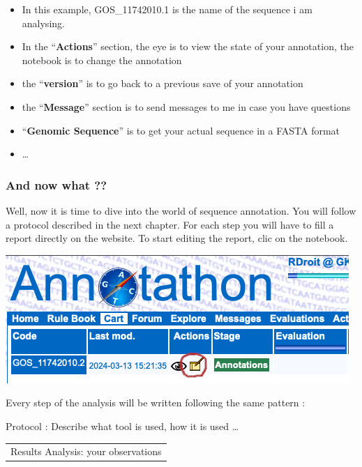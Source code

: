 \documentclass[
]{book}
\providecommand{\tightlist}{%
  \setlength{\itemsep}{0pt}\setlength{\parskip}{0pt}}
\begin{document}
\begin{itemize}
\tightlist
\item
  In this example, GOS\_11742010.1 is the name of the sequence i am analysing.
\item
  In the ``\textbf{Actions}'' section, the eye is to view the state of your annotation, the notebook is to change the annotation
\item
  the ``\textbf{version}'' is to go back to a previous save of your annotation
\item
  the ``\textbf{Message}'' section is to send messages to me in case you have questions
\item
  ``\textbf{Genomic Sequence}'' is to get your actual sequence in a FASTA format
\item
  \ldots{}
\end{itemize}

\hypertarget{and-now-what}{%
\subsubsection{And now what ??}\label{and-now-what}}

Well, now it is time to dive into the world of sequence annotation. You will follow a protocol described in the next chapter. For each step you will have to fill a report directly on the website. To start editing the report, clic on the notebook.

\includegraphics{figures/Annotathon/Annot_edit_report.png}

Every step of the analysis will be written following the same pattern :

Protocol :
Describe what tool is used, how it is used \ldots{}

\begin{longtable}[]{@{}
  >{\raggedright\arraybackslash}p{}@{}}
\toprule\noalign{}
\endhead
\bottomrule\noalign{}
\endlastfoot
Results Analysis:
your observations \\
\end{longtable}
\end{document}
